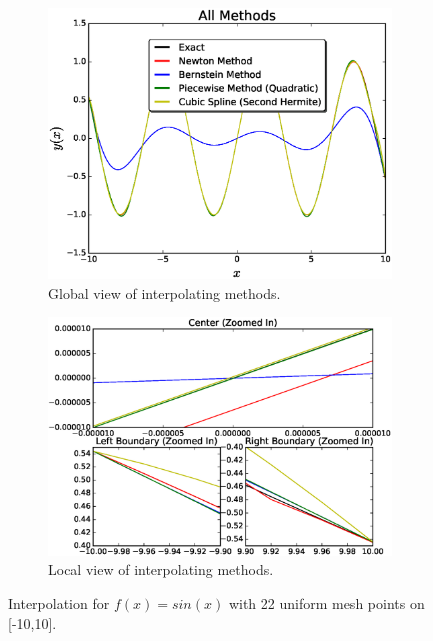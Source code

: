 \documentclass[12pt]{article}
\theoremstyle{remark}
\begin{document}
\begin{figure}[H]
	\centering
	\begin{subfigure}{.5\textwidth}
		\centering
		\includegraphics[width=1.1\linewidth]{fig4.eps}
		\caption{Global view of interpolating methods.}
		\label{fig:sub1}
	\end{subfigure}%
	\begin{subfigure}{.5\textwidth}
		\centering
		\includegraphics[width=1.1\linewidth]{subFig4.eps}
		\caption{Local view of interpolating methods.}
		\label{fig:sub2}
	\end{subfigure}
	\caption{Interpolation for $f(x) = sin(x)$ with 22 uniform mesh points on [-10,10].}
	\label{fig:test}
\end{figure}
\end{document}
